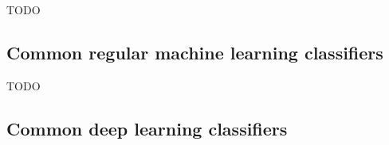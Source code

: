 

TODO


\subsection{Common regular machine learning classifiers}
\label{subsec:processing_signals_ml_and_dl_ml_classifiers}


TODO


\subsection{Common deep learning classifiers}
\label{subsec:processing_signals_ml_and_dl_dl_classifiers}



